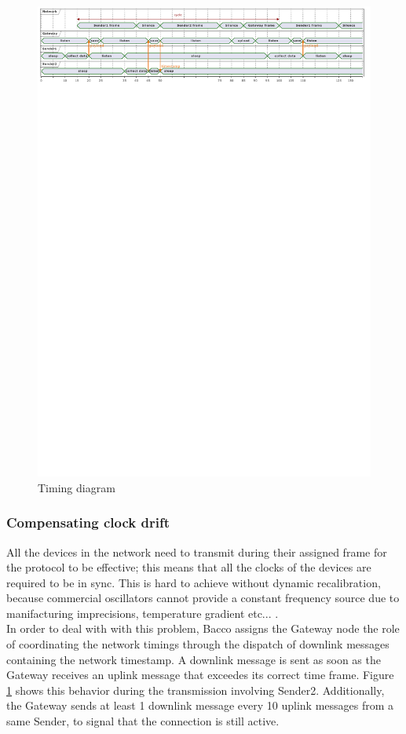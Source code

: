 \begin{figure}
    \centering
    \includegraphics[clip, trim=0cm 25.2cm 0cm 0cm, width=1.0\textwidth]{uml/timings.pdf}
    \caption{Timing diagram}
    \label{timing diagram}
\end{figure}

\subsubsection{Compensating clock drift}
All the devices in the network need to transmit during their assigned frame for the protocol to be effective; this means
that all the clocks of the devices are required to be in sync. This is hard to achieve without dynamic recalibration,
because commercial oscillators cannot provide a constant frequency source due to manifacturing imprecisions,
temperature gradient etc... .\\
In order to deal with with this problem, Bacco assigns the Gateway node the role of coordinating the network timings through
the dispatch of downlink messages containing the network timestamp. A downlink message is sent as soon as the Gateway
receives an uplink message that exceedes its correct time frame. Figure \ref{timing diagram} shows this behavior during
the transmission involving Sender2.
Additionally, the Gateway sends at least 1 downlink message every 10 uplink messages from a same Sender, to
signal that the connection is still active.


